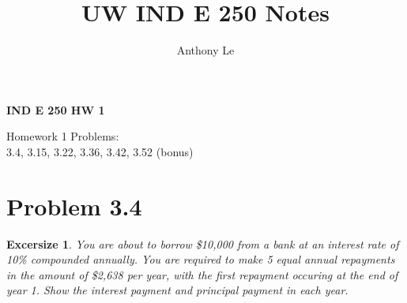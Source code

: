 \documentclass[../INDE250HW.tex]{subfiles}
\title{UW IND E 250 Notes}
\author{Anthony Le}
\newtheorem{exrc}{Excersize}
\begin{document}
\pagestyle{fancy}
\fancyhead{}

\begin{center}
    \LARGE{\textbf{IND E 250 HW 1}}
\end{center}
\begin{center}
    Homework 1 Problems: \\
    3.4, 3.15, 3.22, 3.36, 3.42, 3.52 (bonus)
\end{center}
\section*{Problem 3.4}
\begin{exrc}
    You are about to borrow \$10,000 from a bank at an interest rate of 10\% compounded annually. You are required to make 5 equal annual repayments in the amount of \$2,638 per year, with the first repayment occuring at the end of year 1. Show the interest payment and principal payment in each year.
\end{exrc}
\end{document}
